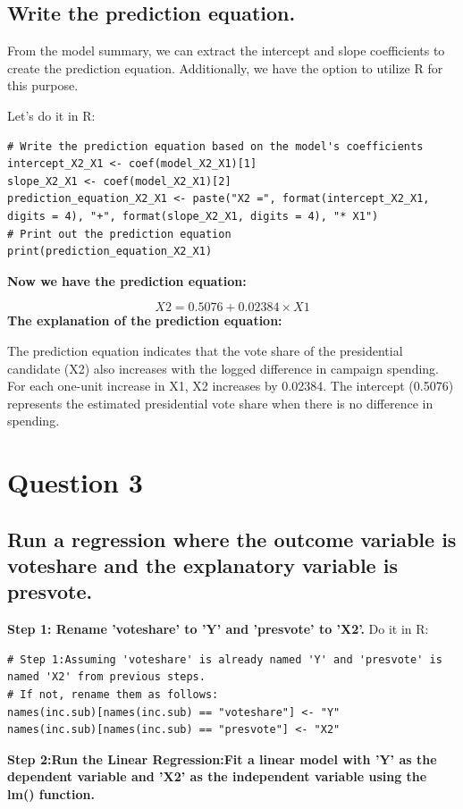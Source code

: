 \documentclass[12pt]{article}
\begin{document}
\subsection{ Write the prediction equation.}

From the model summary, we can extract the intercept and slope coefficients to create the prediction equation. Additionally, we have the option to utilize R for this purpose.
 
Let's do it in R:
\begin{lstlisting}
# Write the prediction equation based on the model's coefficients
intercept_X2_X1 <- coef(model_X2_X1)[1]
slope_X2_X1 <- coef(model_X2_X1)[2]
prediction_equation_X2_X1 <- paste("X2 =", format(intercept_X2_X1, digits = 4), "+", format(slope_X2_X1, digits = 4), "* X1")
# Print out the prediction equation
print(prediction_equation_X2_X1)
\end{lstlisting}
\textbf{Now we have the prediction equation:}

\begin{equation}
X2 = 0.5076 + 0.02384 \times X1
\end{equation}
\textbf{The explanation of the prediction equation:}

The prediction equation indicates that the vote share of the presidential candidate (X2) also increases with the logged difference in campaign spending. For each one-unit increase in X1, X2 increases by 0.02384. The intercept (0.5076) represents the estimated presidential vote share when there is no difference in spending.
\section{Question 3}
\subsection{Run a regression where the outcome variable is voteshare and the explanatory variable is presvote.}
\textbf{Step 1: Rename 'voteshare' to 'Y' and 'presvote' to 'X2'. }
 Do it in R:
\begin{lstlisting}
# Step 1:Assuming 'voteshare' is already named 'Y' and 'presvote' is named 'X2' from previous steps.
# If not, rename them as follows:
names(inc.sub)[names(inc.sub) == "voteshare"] <- "Y"
names(inc.sub)[names(inc.sub) == "presvote"] <- "X2"

\end{lstlisting}
\textbf{Step 2:Run the Linear Regression:Fit a linear model with 'Y' as the dependent variable and 'X2' as the independent variable using the lm() function.}
\end{document}
